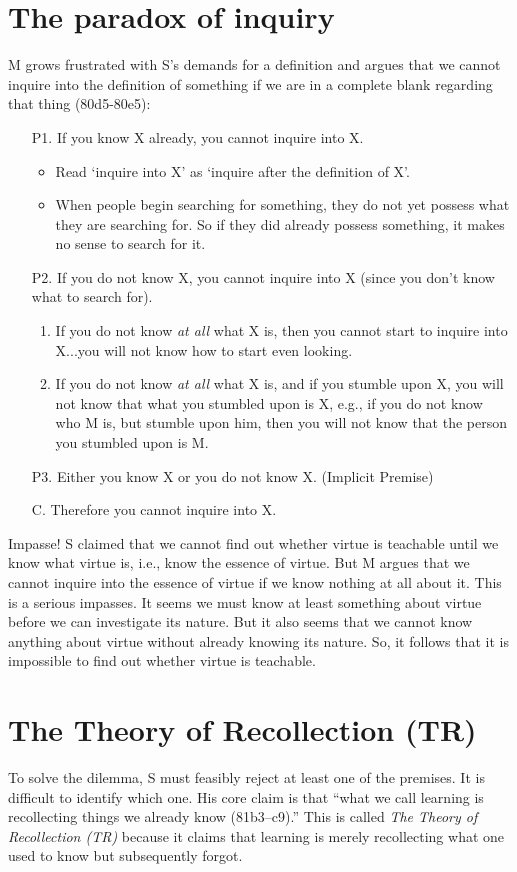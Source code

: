 \documentclass[10 pt]{article}
\begin{document}
\begin{description}
\section*{The paradox of inquiry}
M grows frustrated with S's demands for a definition and argues that we cannot inquire into the definition of something if we are in a complete blank regarding that thing (80d5-80e5):

\begin{enumerate}
\item[P1.] If you know X already, you cannot inquire into X. 
\begin{itemize}
\item Read `inquire into X' as `inquire after the definition of X'. 
\item When people begin searching for something, they do not yet possess what they are searching for. So if they did already possess something, it makes no sense to search for it.
\end{itemize}
\item[P2.] If you do not know X, you cannot inquire into X (since you don't know what to search for).
\begin{enumerate}
\item If you do not know \emph{at all} what X is, then you cannot start to inquire into X...you will not know how to start even looking.
\item If you do not know \emph{at all} what X is, and if you stumble upon X, you will not know that what you stumbled upon is X, e.g., if you do not know who M is, but stumble upon him, then you will not know that the person you stumbled upon is M. 
\end{enumerate}
\item[P3.] Either you know X or you do not know X. (Implicit Premise) 
\item[C.] Therefore you cannot inquire into X.
\end{enumerate}
Impasse!  S claimed that we cannot find out whether virtue is teachable until we know what virtue is, i.e., know the essence of virtue.  But M argues that we cannot inquire into the essence of virtue if we know nothing at all about it. This is a serious impasses. It seems we must know at least something about virtue before we can investigate its nature. But it also seems that we cannot know anything about virtue without already knowing its nature. So, it follows that it is impossible to find out whether virtue is teachable. 

\section*{The Theory of Recollection (TR)}
To solve the dilemma, S must feasibly reject at least one of the premises. It is difficult to identify which one. His core claim is that ``what we call learning is recollecting things we already know (81b3--c9).'' This is called \emph{The Theory of Recollection (TR)} because it claims that learning is merely recollecting what one used to know but subsequently forgot. 


\end{description}
\end{document}
